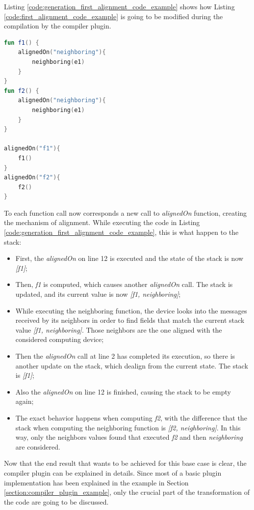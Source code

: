 Listing \ref{code:generation_first_alignment_code_example} shows how Listing \ref{code:first_alignment_code_example} is going to be modified during the compilation by the compiler plugin.
\begin{lstlisting}[caption={Generation goal to handle the alignment of Listing \ref{code:first_alignment_code_example}}, captionpos=b, language=Kotlin, label={code:generation_first_alignment_code_example}]
fun f1() {
    alignedOn("neighboring"){
        neighboring(e1)
    }
}
fun f2() {
    alignedOn("neighboring"){
        neighboring(e1)
    }
}
            
alignedOn("f1"){
    f1()
}
alignedOn("f2"){
    f2()
}
\end{lstlisting}
To each function call now corresponds a new call to \textit{alignedOn} function, creating the mechanism of alignment.\newline
While executing the code in Listing \ref{code:generation_first_alignment_code_example}, this is what happen to the stack:
\begin{itemize}
    \item First, the \textit{alignedOn} on line 12 is executed and the state of the stack is now \textit{[f1]};
    \item Then, \textit{f1} is computed, which causes another \textit{alignedOn} call. The stack is updated, and its current value is now \textit{[f1, neighboring]};
    \item While executing the neighboring function, the device looks into the messages received by its neighbors in order to find fields that match the current stack value \textit{[f1, neighboring]}. Those neighbors are the one aligned with the considered computing device;
    \item Then the \textit{alignedOn} call at line 2 has completed its execution, so there is another update on the stack, which dealign from the current state. The stack is \textit{[f1]};
    \item Also the \textit{alignedOn} on line 12 is finished, causing the stack to be empty again;
    \item The exact behavior happens when computing \textit{f2}, with the difference that the stack when computing the neighboring function is \textit{[f2, neighboring]}. In this way, only the neighbors values found that executed \textit{f2} and then \textit{neighboring} are considered.
\end{itemize}

Now that the end result that wants to be achieved for this base case is clear, the compiler plugin can be explained in details. Since most of a basic plugin implementation has been explained in the example in Section \ref{section:compiler_plugin_example}, only the crucial part of the transformation of the code are going to be discussed.

